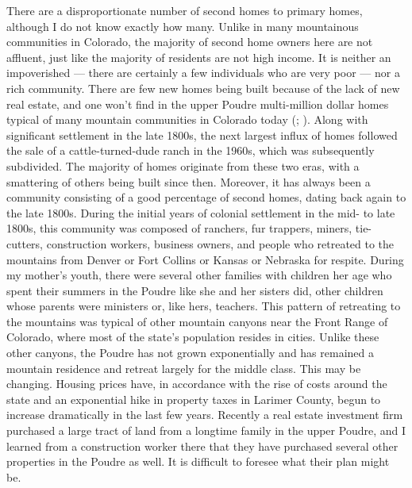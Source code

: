 \documentclass[
]{article}
\begin{document}
There are a disproportionate number of second homes to primary homes, although I do not know exactly how many. Unlike in many mountainous communities in Colorado, the majority of second home owners here are not affluent, just like the majority of residents are not high income. It is neither an impoverished --- there are certainly a few individuals who are very poor --- nor a rich community. There are few new homes being built because of the lack of new real estate, and one won't find in the upper Poudre multi-million dollar homes typical of many mountain communities in Colorado today (; ). Along with significant settlement in the late 1800s, the next largest influx of homes followed the sale of a cattle-turned-dude ranch in the 1960s, which was subsequently subdivided. The majority of homes originate from these two eras, with a smattering of others being built since then. Moreover, it has always been a community consisting of a good percentage of second homes, dating back again to the late 1800s. During the initial years of colonial settlement in the mid- to late 1800s, this community was composed of ranchers, fur trappers, miners, tie-cutters, construction workers, business owners, and people who retreated to the mountains from Denver or Fort Collins or Kansas or Nebraska for respite. During my mother's youth, there were several other families with children her age who spent their summers in the Poudre like she and her sisters did, other children whose parents were ministers or, like hers, teachers. This pattern of retreating to the mountains was typical of other mountain canyons near the Front Range of Colorado, where most of the state's population resides in cities. Unlike these other canyons, the Poudre has not grown exponentially and has remained a mountain residence and retreat largely for the middle class. This may be changing. Housing prices have, in accordance with the rise of costs around the state and an exponential hike in property taxes in Larimer County, begun to increase dramatically in the last few years. Recently a real estate investment firm purchased a large tract of land from a longtime family in the upper Poudre, and I learned from a construction worker there that they have purchased several other properties in the Poudre as well. It is difficult to foresee what their plan might be.
\end{document}
